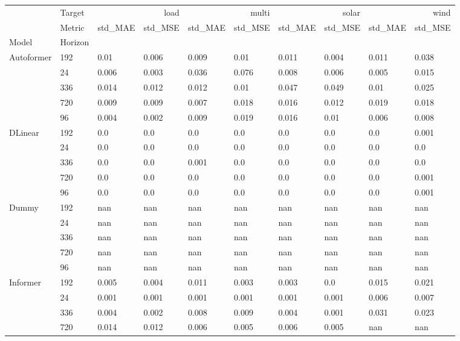 \begin{tabular}{llllllllll}
\toprule
 & Target & \multicolumn{2}{r}{load} & \multicolumn{2}{r}{multi} & \multicolumn{2}{r}{solar} & \multicolumn{2}{r}{wind} \\
 & Metric & std_MAE & std_MSE & std_MAE & std_MSE & std_MAE & std_MSE & std_MAE & std_MSE \\
Model & Horizon &  &  &  &  &  &  &  &  \\
\midrule
\multirow[t]{5}{*}{Autoformer} & 192 & 0.01 & 0.006 & 0.009 & 0.01 & 0.011 & 0.004 & 0.011 & 0.038 \\
 & 24 & 0.006 & 0.003 & 0.036 & 0.076 & 0.008 & 0.006 & 0.005 & 0.015 \\
 & 336 & 0.014 & 0.012 & 0.012 & 0.01 & 0.047 & 0.049 & 0.01 & 0.025 \\
 & 720 & 0.009 & 0.009 & 0.007 & 0.018 & 0.016 & 0.012 & 0.019 & 0.018 \\
 & 96 & 0.004 & 0.002 & 0.009 & 0.019 & 0.016 & 0.01 & 0.006 & 0.008 \\
\cline{1-10}
\multirow[t]{5}{*}{DLinear} & 192 & 0.0 & 0.0 & 0.0 & 0.0 & 0.0 & 0.0 & 0.0 & 0.001 \\
 & 24 & 0.0 & 0.0 & 0.0 & 0.0 & 0.0 & 0.0 & 0.0 & 0.0 \\
 & 336 & 0.0 & 0.0 & 0.001 & 0.0 & 0.0 & 0.0 & 0.0 & 0.0 \\
 & 720 & 0.0 & 0.0 & 0.0 & 0.0 & 0.0 & 0.0 & 0.0 & 0.001 \\
 & 96 & 0.0 & 0.0 & 0.0 & 0.0 & 0.0 & 0.0 & 0.0 & 0.001 \\
\cline{1-10}
\multirow[t]{5}{*}{Dummy} & 192 & nan & nan & nan & nan & nan & nan & nan & nan \\
 & 24 & nan & nan & nan & nan & nan & nan & nan & nan \\
 & 336 & nan & nan & nan & nan & nan & nan & nan & nan \\
 & 720 & nan & nan & nan & nan & nan & nan & nan & nan \\
 & 96 & nan & nan & nan & nan & nan & nan & nan & nan \\
\cline{1-10}
\multirow[t]{5}{*}{Informer} & 192 & 0.005 & 0.004 & 0.011 & 0.003 & 0.003 & 0.0 & 0.015 & 0.021 \\
 & 24 & 0.001 & 0.001 & 0.001 & 0.001 & 0.001 & 0.001 & 0.006 & 0.007 \\
 & 336 & 0.004 & 0.002 & 0.008 & 0.009 & 0.004 & 0.001 & 0.031 & 0.023 \\
 & 720 & 0.014 & 0.012 & 0.006 & 0.005 & 0.006 & 0.005 & nan & nan \\

\end{tabular}
